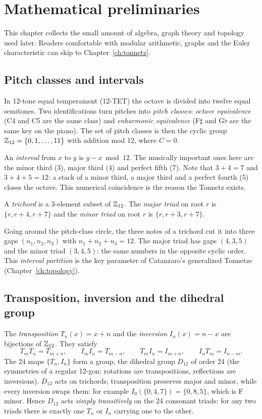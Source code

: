 \chapter{Mathematical preliminaries}\label{ch:prelims}
This chapter collects the small amount of algebra, graph theory and topology used later. Readers comfortable
with modular arithmetic, graphs and the Euler characteristic can skip to Chapter~\ref{ch:tonnetz}.

\section{Pitch classes and intervals}
In 12-tone equal temperament (12-TET) the octave is divided into twelve equal semitones. Two identifications
turn pitches into \emph{pitch classes}: \emph{octave equivalence} (C4 and C5 are the same class) and
\emph{enharmonic equivalence} (F$\sharp$ and G$\flat$ are the same key on the piano). The set of pitch classes is
then the cyclic group $\mathbb{Z}_{12}=\{0,1,\dots,11\}$ with addition mod 12, where $C=0$.

An \emph{interval} from $x$ to $y$ is $y-x \bmod 12$. The musically important ones here are the minor third (3),
major third (4) and perfect fifth (7). Note that $3+4=7$ and $3+4+5=12$: a stack of a minor third, a major third
and a perfect fourth (5) closes the octave. This numerical coincidence is the reason the Tonnetz exists.

\begin{definition}
A \emph{trichord} is a 3-element subset of $\mathbb{Z}_{12}$. The \emph{major triad} on root $r$ is $\{r,r+4,r+7\}$ and the
\emph{minor triad} on root $r$ is $\{r,r+3,r+7\}$.
\end{definition}

Going around the pitch-class circle, the three notes of a trichord cut it into three gaps $(n_1,n_2,n_3)$ with
$n_1+n_2+n_3=12$. The major triad has gaps $(4,3,5)$ and the minor triad $(3,4,5)$: the same numbers in the
opposite cyclic order. This \emph{interval partition} is the key parameter of Catanzaro's generalized Tonnetze
(Chapter~\ref{ch:topology}).

\section{Transposition, inversion and the dihedral group}
The \emph{transposition} $T_n(x)=x+n$ and the \emph{inversion} $I_n(x)=n-x$ are bijections of $\mathbb{Z}_{12}$. They
satisfy
\[
T_mT_n=T_{m+n},\qquad I_mI_n=T_{m-n},\qquad T_mI_n=I_{m+n},\qquad I_nT_m=I_{n-m}.
\]
The 24 maps $\{T_n,I_n\}$ form a group, the dihedral group $D_{12}$ of order 24 (the symmetries of a regular
12-gon: rotations are transpositions, reflections are inversions). $D_{12}$ acts on trichords; transposition
preserves major and minor, while every inversion swaps them: for example $I_0(\{0,4,7\})=\{0,8,5\}$, which is F
minor. Hence $D_{12}$ acts \emph{simply transitively} on the 24 consonant triads: for any two triads there is
exactly one $T_n$ or $I_n$ carrying one to the other.

